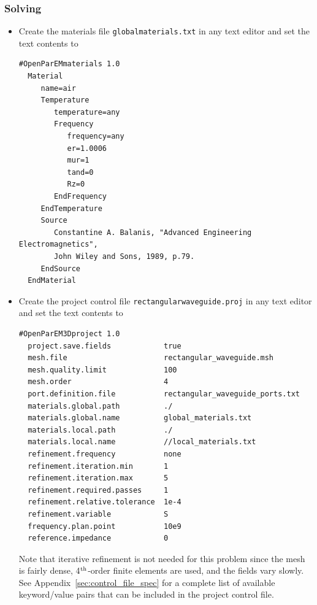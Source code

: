 \documentclass[titlepage]{article}
\renewcommand\_{\textunderscore\linebreak[1]}
\begin{document}
\subsubsection{Solving}

\begin{itemize}

\item Create the materials file \texttt{global\_materials.txt} in any text editor and set the text contents to
\begin{Verbatim}[fontsize=\small]
  #OpenParEMmaterials 1.0
  Material
     name=air
     Temperature
        temperature=any
        Frequency
           frequency=any
           er=1.0006
           mur=1
           tand=0
           Rz=0
        EndFrequency
     EndTemperature
     Source
        Constantine A. Balanis, "Advanced Engineering Electromagnetics",
        John Wiley and Sons, 1989, p.79.
     EndSource
  EndMaterial
\end{Verbatim}
\item Create the project control file \texttt{rectangular\_waveguide.proj} in any text editor and set the text contents to
\begin{Verbatim}[fontsize=\small]
  #OpenParEM3Dproject 1.0
  project.save.fields            true
  mesh.file                      rectangular_waveguide.msh
  mesh.quality.limit             100
  mesh.order                     4
  port.definition.file           rectangular_waveguide_ports.txt
  materials.global.path          ./
  materials.global.name          global_materials.txt
  materials.local.path           ./
  materials.local.name           //local_materials.txt
  refinement.frequency           none
  refinement.iteration.min       1
  refinement.iteration.max       5
  refinement.required.passes     1
  refinement.relative.tolerance  1e-4
  refinement.variable            S
  frequency.plan.point           10e9
  reference.impedance            0
\end{Verbatim}

\noindent Note that iterative refinement is not needed for this problem since the mesh is fairly dense, 4$^{\textnormal{th}}$-order finite elements are used, and the fields vary slowly.  See Appendix~\ref{sec:control_file_spec} for a complete list of available keyword/value pairs that can be included in the project control file.


\end{itemize}
\end{document}
